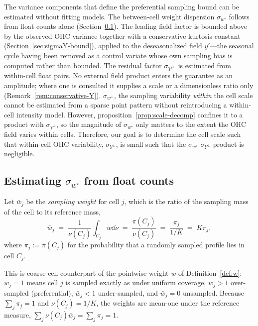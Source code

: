 The variance components that define the preferential sampling bound can be estimated without fitting models.
The between-cell weight dispersion $\sigma_{w^{\star}}$ follows from
float counts alone (Section~\ref{sec:sigmawK}). The leading field factor
is bounded above by the observed OHC variance together with a
conservative kurtosis constant (Section~\ref{sec:sigmaY-bound}), applied
to the deseasonalized field $y'$---the seasonal cycle having been
removed as a control variate whose own sampling bias is computed rather
than bounded. The residual factor
$\sigma_{Y'^{\perp}}$ is estimated from within-cell float pairs. No external field product enters the
guarantee as an amplitude; where one is consulted it supplies a scale or
a dimensionless ratio only (Remark~\ref{rem:conservative-Y}).
$\sigma_{w^{\perp}}$, the sampling variability \emph{within} the cell scale cannot be estimated from a sparse point pattern without reintroducing a within-cell intensity model.
However, proposition~\ref{prop:scale-decomp} confines it to a product with $\sigma_{Y^{\perp}}$, so the magnitude of $\sigma_{w^{\star}}$ only matters to the extent the OHC field varies within cells.
Therefore, our goal is to determine the cell scale such that within-cell OHC variability, $\sigma_{Y^{\perp}}$, is small such that the $\sigma_{w^{\star}}$ $\sigma_{Y^{\perp}}$ product is negligible.

\subsection{Estimating $\sigma_{w^{\star}}$ from float counts}
\label{sec:sigmawK}

\begin{definition}
\label{def:sweight}
Let $\bar w_j$ be the \emph{sampling weight} for cell $j$, which is the ratio of the sampling mass of the cell to its reference mass,
\begin{equation}
  \bar w_j \;=\; \frac{1}{\nu(C_j)}\int_{C_j}w\dd\nu \;=\; \frac{\pi(C_j)}{\nu(C_j)} \;=\; \frac{\pi_j}{1/K}
  \;=\; K\pi_j ,
  \label{eq:cell-weight}
\end{equation}
where $\pi_j:=\pi(C_j)$ for the probability that a randomly sampled profile lies in cell $C_j$.
\end{definition}

This is coarse cell counterpart of the pointwise weight $w$ of
Definition~\ref{def:w}: $\bar w_j=1$ means cell $j$ is sampled exactly as
under uniform coverage, $\bar w_j>1$ over-sampled (preferential),
$\bar w_j<1$ under-sampled, and $\bar w_j=0$ unsampled. Because
$\sum_j\pi_j=1$ and $\nu(C_j)=1/K$, the weights are mean-one under the
reference measure, $\sum_j\nu(C_j)\bar w_j=\sum_j\pi_j=1$.

